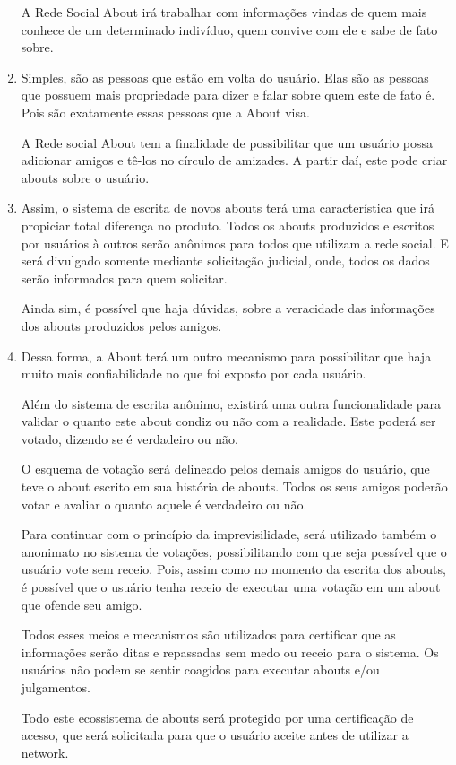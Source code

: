 \begin{enumerate}
        A Rede Social About irá trabalhar com informações vindas de quem mais conhece de um determinado
        indivíduo, quem convive com ele e sabe de fato sobre. 
    \item Simples, são as pessoas que estão em volta do usuário. Elas são as pessoas que possuem mais propriedade para dizer
        e falar sobre quem este de fato é. Pois são exatamente essas pessoas que a About visa.

        A Rede social About tem a finalidade de possibilitar que um usuário possa adicionar amigos  e tê-los no círculo de amizades.
        A partir daí, este pode criar abouts sobre o usuário.

    \item Assim, o sistema de escrita de novos abouts terá uma característica que irá propiciar total diferença
        no produto. Todos os abouts produzidos e escritos por usuários à outros serão anônimos para todos
        que utilizam a rede social. E será divulgado somente mediante solicitação judicial, onde, todos
        os dados serão informados para quem solicitar.


        Ainda sim, é possível que haja dúvidas, sobre a veracidade das informações dos abouts produzidos pelos amigos.

    \item Dessa forma, a About terá um outro mecanismo para possibilitar que haja muito mais confiabilidade no que foi exposto
        por cada usuário.

        Além do sistema de escrita anônimo, existirá uma outra funcionalidade para validar o quanto este about condiz ou não
        com a realidade. Este poderá ser votado, dizendo se é verdadeiro ou não. 

O esquema de votação será delineado pelos demais amigos do usuário, que teve o about escrito em sua história de abouts.
Todos os seus amigos poderão votar e avaliar o quanto aquele é verdadeiro ou não.

Para continuar com o princípio da imprevisilidade, será utilizado também o anonimato no sistema de votações, possibilitando
com que seja possível que o usuário vote sem receio. Pois, assim como no momento da escrita dos abouts, é possível que o 
usuário tenha receio de executar uma votação em um about que ofende seu amigo.

Todos esses meios e mecanismos são utilizados para certificar que as informações serão ditas e repassadas sem medo
ou receio para o sistema. Os usuários não podem se sentir coagidos para executar abouts e/ou julgamentos. 

Todo este ecossistema de abouts será protegido por uma certificação de acesso, que será solicitada para que o usuário
aceite antes de utilizar a network.
\end{enumerate}


